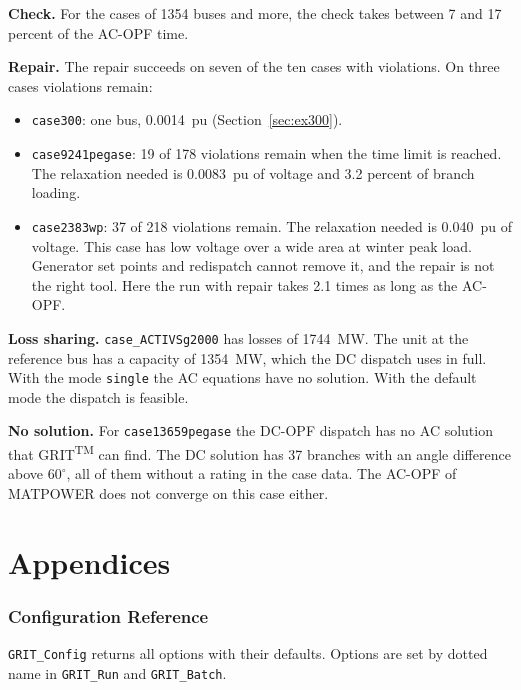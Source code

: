 \documentclass[a4paper,11pt]{article}
\newcommand{\TM}{\textsuperscript{TM}}
\newcommand{\GRIT}{GRIT\TM}
\begin{document}
\textbf{Check.} For the cases of 1354 buses and more, the check takes between 7 and 17 percent of the AC-OPF time.

\textbf{Repair.} The repair succeeds on seven of the ten cases with violations. On three cases violations remain:

\begin{itemize}[nosep]
  \item \texttt{case300}: one bus, 0.0014~pu (Section~\ref{sec:ex300}).
  \item \texttt{case9241pegase}: 19 of 178 violations remain when the time limit is reached. The relaxation needed is 0.0083~pu of voltage and 3.2 percent of branch loading.
  \item \texttt{case2383wp}: 37 of 218 violations remain. The relaxation needed is 0.040~pu of voltage. This case has low voltage over a wide area at winter peak load. Generator set points and redispatch cannot remove it, and the repair is not the right tool. Here the run with repair takes 2.1 times as long as the AC-OPF.
\end{itemize}

\textbf{Loss sharing.} \texttt{case\_ACTIVSg2000} has losses of 1744~MW. The unit at the reference bus has a capacity of 1354~MW, which the DC dispatch uses in full. With the mode \texttt{single} the AC equations have no solution. With the default mode the dispatch is feasible.

\textbf{No solution.} For \texttt{case13659pegase} the DC-OPF dispatch has no AC solution that \GRIT{} can find. The DC solution has 37 branches with an angle difference above $60^\circ$, all of them without a rating in the case data. The AC-OPF of MATPOWER does not converge on this case either.

\part{Appendices}\label{part:appendices}

\clearpage
\section{Configuration Reference}\label{sec:configref}

\texttt{GRIT\_Config} returns all options with their defaults. Options are set by dotted name in \texttt{GRIT\_Run} and \texttt{GRIT\_Batch}.
\end{document}
